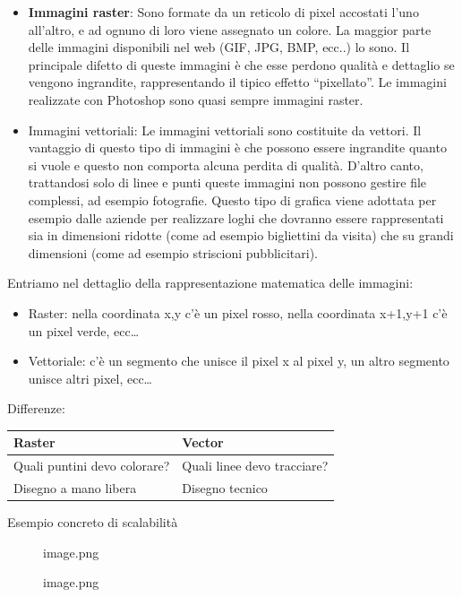 \documentclass[
]{article}
\providecommand{\tightlist}{%
  \setlength{\itemsep}{0pt}\setlength{\parskip}{0pt}}
\begin{document}
\begin{itemize}
\tightlist
\item
  \textbf{Immagini raster}:
  Sono formate da un reticolo di pixel accostati l'uno all'altro, e ad ognuno di loro viene assegnato un colore. La maggior parte delle immagini disponibili nel web (GIF, JPG, BMP, ecc..) lo sono. Il principale difetto di queste immagini è che esse perdono qualità e dettaglio se vengono ingrandite, rappresentando il tipico effetto ``pixellato''. Le immagini realizzate con Photoshop sono quasi sempre immagini raster.
\item
  Immagini vettoriali:
  Le immagini vettoriali sono costituite da vettori. Il vantaggio di questo tipo di immagini è che possono essere ingrandite quanto si vuole e questo non comporta alcuna perdita di qualità.
  D'altro canto, trattandosi solo di linee e punti queste immagini non possono gestire file complessi, ad esempio fotografie. Questo tipo di grafica viene adottata per esempio dalle aziende per realizzare loghi che dovranno essere rappresentati sia in dimensioni ridotte (come ad esempio bigliettini da visita) che su grandi dimensioni (come ad esempio striscioni pubblicitari).
\end{itemize}

Entriamo nel dettaglio della rappresentazione matematica delle immagini:

\begin{itemize}
\tightlist
\item
  Raster: nella coordinata x,y c'è un pixel rosso, nella coordinata x+1,y+1 c'è un pixel verde, ecc\ldots{}
\item
  Vettoriale: c'è un segmento che unisce il pixel x al pixel y, un altro segmento unisce altri pixel, ecc\ldots{}
\end{itemize}

Differenze:

\begin{longtable}[]{@{}ll@{}}
\toprule\noalign{}
Raster & Vector \\
\midrule\noalign{}
\endhead
\bottomrule\noalign{}
\endlastfoot
Quali puntini devo colorare? & Quali linee devo tracciare? \\
Disegno a mano libera & Disegno tecnico \\
\end{longtable}

Esempio concreto di scalabilità

\begin{figure}
\centering
{image.png}
\caption{image.png}
\end{figure}
\end{document}
